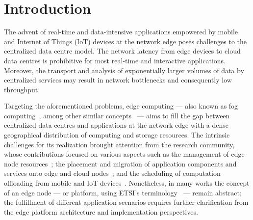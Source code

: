 \section{Introduction}

The advent of real-time and data-intensive applications empowered by mobile and Internet of Things (IoT) devices 
at the network edge 
poses challenges to the centralized data centre model. The network latency from edge devices to cloud data centres is prohibitive for most real-time and interactive applications.
Moreover, the transport and analysis of exponentially larger volumes of data by centralized services may result in network bottlenecks and consequently low throughput. 

Targeting the aforementioned problems, edge computing --- also known as fog computing~\cite{Bonomi:2012}, among other similar concepts~\cite{Satyanarayanan:2009,Taleb:2013,ETSI:MEC:2016:03} --- aims to fill the gap between centralized data centres and applications at the network edge with a dense geographical distribution of computing and storage resources. The intrinsic challenges for its realization brought attention from the research community, whose contributions focused on various aspects such as the management of edge node resources~\cite{N.Wang:2017}; the placement and migration of application components and services onto edge and cloud nodes~\cite{Wang:2015a,Wang:2017,Machen:2018}; and the scheduling of computation offloading from mobile and IoT devices~\cite{Liu:2016, OrsiniBL16}. Nonetheless, in many works the concept of an edge node --- or platform, using ETSI's terminology~\cite{ETSI:MEC:2016:03} --- remain abstract; the fulfillment of different application scenarios requires further clarification from the edge platform architecture and implementation perspectives.










